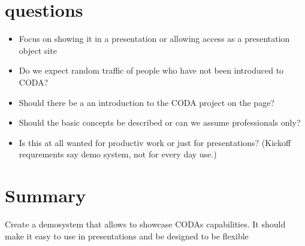 \section{questions}
\begin{itemize}
    \item Focus on showing it in a presentation or allowing access as a presentation object site
    \item Do we expect random traffic of people who have not been introduced to CODA?
    \item Should there be a an introduction to the CODA project on the page?
    \item Should the basic concepts be described or can we assume professionals only?
    \item Is this at all wanted for productiv work or just for presentations? (Kickoff requrements say demo system, not for every day use.)
\end{itemize}

\section{Summary}
Create a demosystem that allows to showcase CODAs capabilities. It should make it easy to use in presentations and be designed to be flexible 